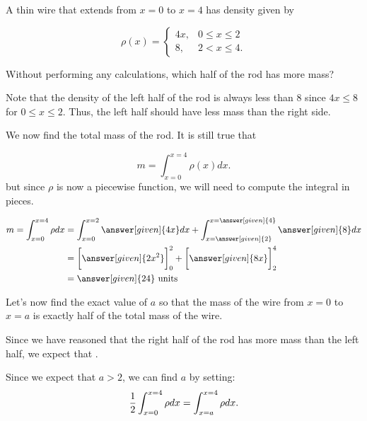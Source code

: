 \documentclass{ximera}
\begin{document}
\begin{example}
A thin wire that extends from $x=0$ to $x=4$ has density given by

\[ \rho(x) = \left\{ 
\begin{array}{cl}
4x, & 0 \leq x\leq 2 \\
8 ,& 2 < x \leq 4.
\end{array} \right.
\]

Without performing any calculations, which half of the rod has more mass?

\begin{multipleChoice}
\end{multipleChoice}

\begin{explanation}
Note that the density of the left half of the rod is always less than 8 since $4x \leq 8$ for $0\leq x \leq 2$.  Thus, the left half should have less mass than the right side.


We now find the total mass of the rod.  It is still true that

\[
m = \int_{x=0}^{x=4} \rho(x) dx.
\]
but since $\rho$ is now a piecewise function, we will need to compute the integral in pieces.  

\begin{align*}
m = \int_{x=0}^{x=4} \rho dx & = \int_{x=0}^{x=2} \answer[given]{4x} dx + \int_{x=\answer[given]{2}}^{x=\answer[given]{4}} \answer[given]{8} dx \\
&= \bigg[\answer[given]{2x^2}\bigg]_0^2+\bigg[{\answer[given]{8x}}\bigg]_2^4 \\
&= \answer[given]{24} \textrm{ units}
\end{align*}
\end{explanation}

Let's now find the exact value of $a$ so that the mass of the wire from $x=0$ to $x=a$ is exactly half of the total mass of the wire. 

\begin{explanation}
Since we have reasoned that the right half of the rod has more mass than the left half, we expect that  .

 Since we expect that $a>2$, we can find $a$ by setting:
 \[
\frac{1}{2} \int_{x=0}^{x=4} \rho dx =  \int_{x=a}^{x=4} \rho dx. \\
 \]


\end{explanation}
\end{example}
\end{document}
